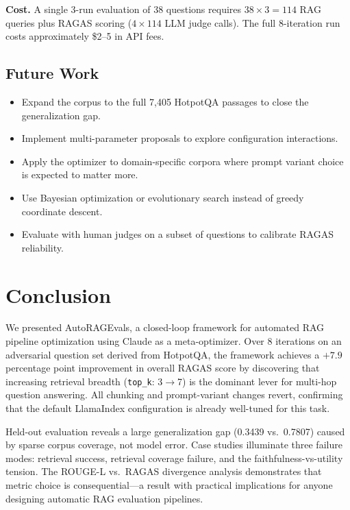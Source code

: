 \documentclass[11pt,a4paper]{article}
\begin{document}
\textbf{Cost.} A single 3-run evaluation of 38 questions requires
$38 \times 3 = 114$ RAG queries plus RAGAS scoring ($4 \times 114$ LLM judge
calls). The full 8-iteration run costs approximately \$2--5 in API fees.

\subsection{Future Work}

\begin{itemize}[leftmargin=2em]
  \item Expand the corpus to the full 7,405 HotpotQA passages to close the
    generalization gap.
  \item Implement multi-parameter proposals to explore configuration
    interactions.
  \item Apply the optimizer to domain-specific corpora where prompt variant
    choice is expected to matter more.
  \item Use Bayesian optimization or evolutionary search instead of greedy
    coordinate descent.
  \item Evaluate with human judges on a subset of questions to calibrate RAGAS
    reliability.
\end{itemize}

\section{Conclusion}

We presented AutoRAGEvals, a closed-loop framework for automated RAG pipeline
optimization using Claude as a meta-optimizer. Over 8 iterations on an
adversarial question set derived from HotpotQA, the framework achieves a
$+7.9$ percentage point improvement in overall RAGAS score by discovering that
increasing retrieval breadth (\texttt{top\_k}: 3$\to$7) is the dominant lever
for multi-hop question answering. All chunking and prompt-variant changes
revert, confirming that the default LlamaIndex configuration is already
well-tuned for this task.

Held-out evaluation reveals a large generalization gap (0.3439 vs.\ 0.7807)
caused by sparse corpus coverage, not model error. Case studies illuminate
three failure modes: retrieval success, retrieval coverage failure, and the
faithfulness-vs-utility tension. The ROUGE-L vs.\ RAGAS divergence analysis
demonstrates that metric choice is consequential---a result with practical
implications for anyone designing automatic RAG evaluation pipelines.
\end{document}
